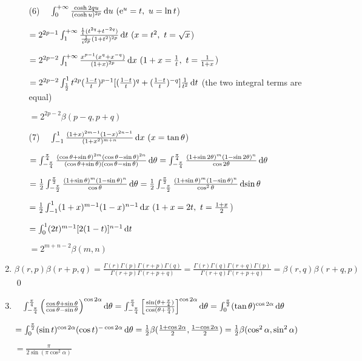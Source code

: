 \begin{enumerate}[1]
\begin{enumerate}[(1)]
        \item[(6)]
        $\phantom{=} \int_0^{+\infty} \frac{\cosh 2qu}{(\cosh u)^{2p}}\dif u\ (\me^u=t,\ u=\ln t$)
        \par $=2^{2p-1}\int_1^{+\infty} \frac{\frac{1}{t}(t^{2q}+t^{-2q})}{\frac{1}{t^{2p}}(1+t^2)^{2p}} \dif t\ (x=t^2,\ t=\sqrt{x}$)
        \par $=2^{2p-2} \int_1^{+\infty} \frac{x^{p-1}(x^q+x^{-q})}{(1+x)^{2p}}\dif x\ (1+x=\frac{1}{t},\ t=\frac{1}{1+x}$)
        \par $=2^{2p-2}\int_\frac{1}{2}^1 t^{2p}(\frac{1-t}{t})^{p-1}[(\frac{1-t}{t})^q+(\frac{1-t}{t})^{-q}]\frac{1}{t^2} \dif t$ (the two integral terms are equal)
        \par $=2^{2p-2}\beta(p-q,p+q)$
        
        \item[(7)]
        $\phantom{=} \int_{-1}^1 \frac{(1+x)^{2m-1}(1-x)^{2n-1}}{(1+x^2)^{m+n}}\dif x\ (x=\tan\theta$)
        \par $=\int_{-\frac{\pi}{4}}^{\frac{\pi}{4}} \frac{(\cos \theta+ \sin \theta)^{2m}(\cos \theta- \sin \theta)^{2n}}{(\cos \theta+ \sin \theta)(\cos \theta- \sin \theta)}\dif \theta=\int_{-\frac{\pi}{4}}^{\frac{\pi}{4}} \frac{(1+ \sin 2\theta)^m(1- \sin 2\theta)^n}{\cos 2\theta}\dif \theta$
        \par $=\frac{1}{2}\int_{-\frac{\pi}{2}}^{\frac{\pi}{2}} \frac{(1+ \sin \theta)^m(1- \sin \theta)^n}{\cos \theta}\dif \theta=\frac{1}{2}\int_{-\frac{\pi}{2}}^{\frac{\pi}{2}} \frac{(1+ \sin \theta)^m(1- \sin \theta)^n}{\cos ^2\theta}\dif \sin \theta$
        \par $=\frac{1}{2}\int_{-1}^1 (1+x)^{m-1} (1-x)^{n-1} \dif x\ (1+x=2t,\ t=\frac{1+x}{2}$)
        \par $=\int_0^1 (2t)^{m-1}[2(1-t)]^{n-1} \dif t$
        \par $=2^{m+n-2}\beta(m,n)$
        \end{enumerate}
        
    \item
    $\beta(r,p)\beta(r+p,q)=\frac{\Gamma(r)\Gamma(p)\Gamma(r+p)\Gamma(q)}{\Gamma(r+p)\Gamma(r+p+q)}=\frac{\Gamma(r)\Gamma(q)\Gamma(r+q)\Gamma(p)}{\Gamma(r+q)\Gamma(r+p+q)}=\beta(r,q)\beta(r+q,p)$\qed

    \item 
    $\phantom{=} \int_{-\frac{\pi}{4}}^{\frac{\pi}{4}}\left(\frac{\cos \theta+\sin \theta}{\cos \theta-\sin \theta}\right)^{\cos 2 \alpha} \dif \theta =\int_{-\frac{\pi}{4}}^{\frac{\pi}{4}}\left[\frac{\sin(\theta+\frac{\pi}{4})}{\cos(\theta+\frac{\pi}{4})}\right]^{\cos 2 \alpha} \dif \theta =\int_{0}^{\frac{\pi}{2}}(\tan \theta)^{\cos 2 \alpha} \dif \theta$ 
    \par $ = \int_{0}^{\frac{\pi}{2}} (\sin t)^{\cos 2 \alpha}(\cos t)^{-\cos 2 \alpha} \dif \theta = \frac{1}{2}\beta(\frac{1+\cos 2 \alpha}{2},\frac{1-\cos 2 \alpha}{2}) = \frac{1}{2}\beta(\cos ^2 \alpha,\sin ^2 \alpha)$
    \par $= \frac{\pi }{2\sin(\pi \cos^2 \alpha)}$
\end{enumerate}